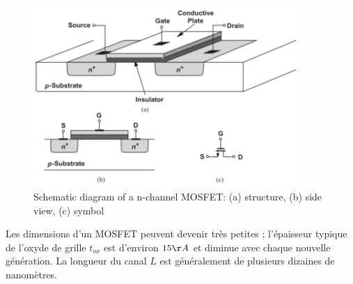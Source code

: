 \begin{figure}[h!]
\centering
\includegraphics[width=10cm]{figures/ch01/mosfet1b.jpg}
\caption{Schematic diagram of a n-channel MOSFET: (a) structure, (b) side view, (c) symbol} 
\label{fig:mosfet1}
\end{figure}

Les dimensions d'un MOSFET peuvent devenir très petites ; l'épaisseur typique de l'oxyde de grille $t_{ox}$ est d'environ $15 \AA$ et diminue avec chaque nouvelle génération. La longueur du canal $L$ est généralement de plusieurs dizaines de nanomètres.

